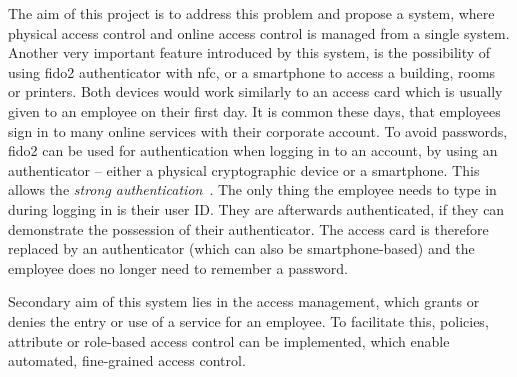 The aim of this project is to address this problem and propose a system, where physical access control and online access control is managed from a single system. Another very important feature introduced by this system, is the possibility of using \acrshort{fido}2 authenticator with \acrshort{nfc}, or a smartphone to access a building, rooms or printers. Both devices would work similarly to an access card which is usually given to an employee on their first day. It is common these days, that employees sign in to many online services with their corporate account. To avoid passwords, \acrshort{fido}2 can be used for authentication when logging in to an account, by using an authenticator -- either a physical cryptographic device or a smartphone. This allows the \textit{strong authentication}~\cite{McDowell2017WhyAlliance}. The only thing the employee needs to type in during logging in is their user ID. They are afterwards authenticated, if they can demonstrate the possession of their  authenticator. The access card is therefore replaced by an authenticator (which can also be smartphone-based) and the employee does no longer need to remember a password.

Secondary aim of this system lies in the access management, which grants or denies the entry or use of a service for an employee. To facilitate this, policies, attribute or role-based access control can be implemented, which enable automated, fine-grained access control.



